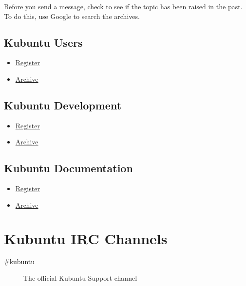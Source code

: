 \documentclass[letterpaper,10pt,english]{sphinxmanual}
\begin{document}
Before you send a message, check to see if the topic has been raised in the past. To do this, use Google to search the archives.


\subsection{Kubuntu Users}
\label{\detokenize{docs/contribute:kubuntu-users}}\begin{itemize}
\item {} 
\href{https://lists.ubuntu.com/mailman/listinfo/kubuntu-users}{Register}

\item {} 
\href{https://lists.ubuntu.com/archives/kubuntu-users}{Archive}

\end{itemize}


\subsection{Kubuntu Development}
\label{\detokenize{docs/contribute:kubuntu-development}}\begin{itemize}
\item {} 
\href{https://lists.ubuntu.com/mailman/listinfo/kubuntu-devel}{Register}

\item {} 
\href{https://lists.ubuntu.com/archives/kubuntu-devel}{Archive}

\end{itemize}


\subsection{Kubuntu Documentation}
\label{\detokenize{docs/contribute:kubuntu-documentation}}\begin{itemize}
\item {} 
\href{https://lists.ubuntu.com/mailman/listinfo/ubuntu-doc}{Register}

\item {} 
\href{https://lists.ubuntu.com/archives/ubuntu-doc}{Archive}

\end{itemize}


\section{Kubuntu IRC Channels}
\label{\detokenize{docs/contribute:kubuntu-irc-channels}}\begin{description}
\item[{\#kubuntu}] \leavevmode
The official Kubuntu Support channel

\end{description}
\end{document}
